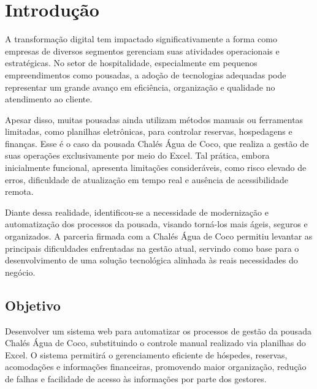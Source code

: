 \documentclass[
	12pt,				%
	openany,			%
	twoside,			%
	a4paper,			%
	english,			%
	french,				%
	spanish,			%
	brazil				%
	]{abntex2}
\renewcommand*{\cleardoublepage}{\clearpage}
\begin{document}
\tableofcontents*
\cleardoublepage



\textual

\chapter{Introdução}

A transformação digital tem impactado significativamente a forma como empresas de diversos segmentos gerenciam suas atividades operacionais e estratégicas. No setor de hospitalidade, especialmente em pequenos empreendimentos como pousadas, a adoção de tecnologias adequadas pode representar um grande avanço em eficiência, organização e qualidade no atendimento ao cliente.

Apesar disso, muitas pousadas ainda utilizam métodos manuais ou ferramentas limitadas, como planilhas eletrônicas, para controlar reservas, hospedagens e finanças. Esse é o caso da pousada Chalés Água de Coco, que realiza a gestão de suas operações exclusivamente por meio do Excel. Tal prática, embora inicialmente funcional, apresenta limitações consideráveis, como risco elevado de erros, dificuldade de atualização em tempo real e ausência de acessibilidade remota.

Diante dessa realidade, identificou-se a necessidade de modernização e automatização dos processos da pousada, visando torná-los mais ágeis, seguros e organizados. A parceria firmada com a Chalés Água de Coco permitiu levantar as principais dificuldades enfrentadas na gestão atual, servindo como base para o desenvolvimento de uma solução tecnológica alinhada às reais necessidades do negócio.

\section{Objetivo}
Desenvolver um sistema web para automatizar os processos de gestão da pousada Chalés Água de Coco, substituindo o controle manual realizado via planilhas do Excel. O sistema permitirá o gerenciamento eficiente de hóspedes, reservas, acomodações e informações financeiras, promovendo maior organização, redução de falhas e facilidade de acesso às informações por parte dos gestores.
\end{document}
